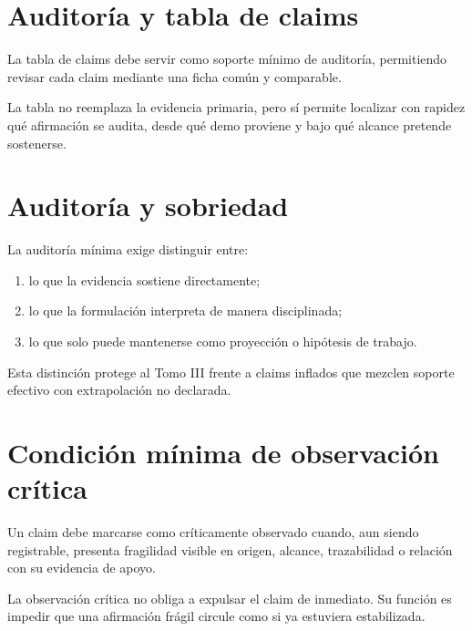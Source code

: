 \section{Auditoría y tabla de claims}
\begin{definition}
La tabla de claims debe servir como soporte mínimo de auditoría, permitiendo revisar cada claim mediante una ficha común y comparable.
\end{definition}

\begin{observation}
La tabla no reemplaza la evidencia primaria, pero sí permite localizar con rapidez qué afirmación se audita, desde qué demo proviene y bajo qué alcance pretende sostenerse.
\end{observation}

\section{Auditoría y sobriedad}
\begin{definition}
La auditoría mínima exige distinguir entre:
\begin{enumerate}
  \item lo que la evidencia sostiene directamente;
  \item lo que la formulación interpreta de manera disciplinada;
  \item lo que solo puede mantenerse como proyección o hipótesis de trabajo.
\end{enumerate}
\end{definition}

\begin{observation}
Esta distinción protege al Tomo III frente a claims inflados que mezclen soporte efectivo con extrapolación no declarada.
\end{observation}

\section{Condición mínima de observación crítica}
\begin{definition}
Un claim debe marcarse como críticamente observado cuando, aun siendo registrable, presenta fragilidad visible en origen, alcance, trazabilidad o relación con su evidencia de apoyo.
\end{definition}

\begin{observation}
La observación crítica no obliga a expulsar el claim de inmediato. Su función es impedir que una afirmación frágil circule como si ya estuviera estabilizada.
\end{observation}

